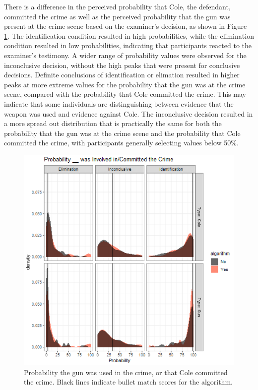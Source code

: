 \documentclass[print]{nuthesis}
\begin{document}
There is a difference in the perceived probability that Cole, the defendant, committed the crime as well as the perceived probability that the gun was present at the crime scene based on the examiner's decision, as shown in Figure \ref{fig:probalgorithm}.
The identification condition resulted in high probabilities, while the elimination condition resulted in low probabilities, indicating that participants reacted to the examiner's testimony.
A wider range of probability values were observed for the inconclusive decision, without the high peaks that were present for conclusive decisions.
Definite conclusions of identification or elimation resulted in higher peaks at more extreme values for the probability that the gun was at the crime scene, compared with the probability that Cole committed the crime.
This may indicate that some individuals are distinguishing between evidence that the weapon was used and evidence against Cole.
The inconclusive decision resulted in a more spread out distribution that is practically the same for both the probability that the gun was at the crime scene and the probability that Cole committed the crime, with participants generally selecting values below 50\%.

\begin{figure}

{\centering \includegraphics[width=\linewidth]{images/probalgorithm} 

}

\caption[Probability the gun was used in the crime, or that Cole committed the crime.]{Probability the gun was used in the crime, or that Cole committed the crime. Black lines indicate bullet match scores for the algorithm.}\label{fig:probalgorithm}
\end{figure}
\end{document}
